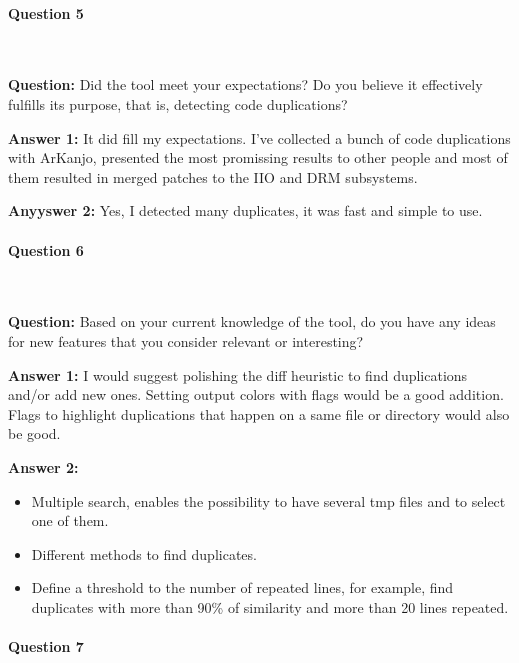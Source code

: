 \paragraph{Question 5}

\

\textbf{Question:} Did the tool meet your expectations? Do you believe it effectively 
fulfills its purpose, that is, detecting code duplications?

\textbf{Answer 1:} It did fill my expectations. I've collected a bunch of code duplications with ArKanjo,
presented the most promissing results to other people and most of them resulted in merged patches to the 
IIO and DRM subsystems.

\textbf{Anyyswer 2:} Yes, I detected many duplicates, it was fast and simple to use.

\paragraph{Question 6}

\

\textbf{Question:} Based on your current knowledge of the tool, do you have any ideas 
for new features that you consider relevant or interesting?

\textbf{Answer 1:} I would suggest polishing the diff heuristic to find duplications and/or add new ones. 
Setting output colors with flags would be a good addition. Flags to highlight duplications that happen on 
a same file or directory would also be good.

\textbf{Answer 2:} 

\begin{itemize}

\item Multiple search, enables the possibility to have several tmp files and to select one
of them.

\item Different methods to find duplicates.

\item Define a threshold to the number of repeated lines, for example, find duplicates
with more than 90\% of similarity and more than 20 lines repeated.

\end{itemize}

\paragraph{Question 7}


